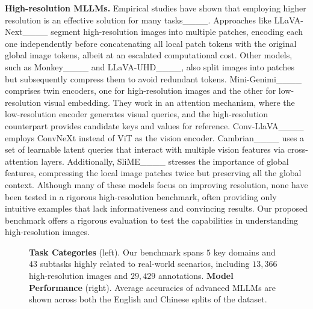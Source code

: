 \textbf{High-resolution MLLMs.} 
Empirical studies have shown that employing higher resolution is an effective solution for many tasks____. Approaches like LLaVA-Next____ segment high-resolution images into multiple patches, encoding each one independently before concatenating all local patch tokens with the original global image tokens, albeit at an escalated computational cost. Other models, such as Monkey____ and LLaVA-UHD____, also split images into patches but subsequently compress them to avoid redundant tokens. Mini-Genimi____ comprises twin encoders, one for high-resolution images and the other for low-resolution visual embedding. They work in an attention mechanism, where the low-resolution encoder generates visual queries, and the high-resolution counterpart provides candidate keys and values for reference. Conv-LlaVA____ employs ConvNeXt instead of ViT as the vision encoder. Cambrian____ uses a set of learnable latent queries that interact with multiple vision features via cross-attention layers. Additionally, SliME____ stresses the importance of global features, compressing the local image patches twice but preserving all the global context. Although many of these models focus on improving resolution, none have been tested in a rigorous high-resolution benchmark, often providing only intuitive examples that lack informativeness and convincing results. Our proposed benchmark offers a rigorous evaluation to test the capabilities in understanding high-resolution images.

\begin{figure*}[t]
\centering
{}%
%
\centering
\vspace{-0.2cm}
\caption{\textbf{Task Categories} (left). Our benchmark spans $5$ key domains and $43$ subtasks highly related to real-world scenarios, including $13,366$ high-resolution images and $29,429$ annotations. \textbf{Model Performance} (right). Average accuracies of advanced MLLMs are shown across both the English and Chinese splits of the dataset.}
\label{fig:teaser}
\end{figure*}